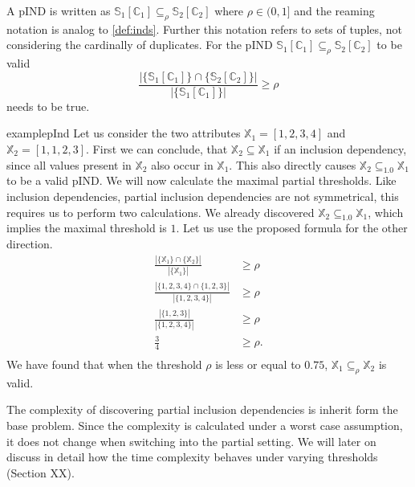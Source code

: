 \begin{definition}\label{def:pinds}
    A pIND is written as $\mathbb{S}_1[\mathbb{C}_1] \subseteq_{\rho} \mathbb{S}_2[\mathbb{C}_2]$ where $\rho \in (0, 1]$ and the reaming notation is analog to \ref{def:inds}. Further this notation refers to sets of tuples, not considering the cardinally of duplicates. For the pIND $\mathbb{S}_1[\mathbb{C}_1] \subseteq_{\rho} \mathbb{S}_2[\mathbb{C}_2]$ to be valid
    $$
        \frac{|\{\mathbb{S}_1[\mathbb{C}_1]\} \cap \{\mathbb{S}_2[\mathbb{C}_2]\}|}
            {|\{\mathbb{S}_1[\mathbb{C}_1]\}|} \geq \rho
    $$
    needs to be true.
\end{definition}

\begin{restatable}{example}{pInd}\label{exmp:pInd}
    Let us consider the two attributes $\mathbb{X}_1 = [1, 2, 3, 4]$ and $\mathbb{X}_2 = [1, 1, 2, 3]$. First we can conclude, that $\mathbb{X}_2 \subseteq \mathbb{X}_1$ if an inclusion dependency, since all values present in $\mathbb{X}_2$ also occur in $\mathbb{X}_1$. This also directly causes $\mathbb{X}_2 \subseteq_{1.0} \mathbb{X}_1$ to be a valid pIND. We will now calculate the maximal partial thresholds. Like inclusion dependencies, partial inclusion dependencies are not symmetrical, this requires us to perform two calculations. We already discovered $\mathbb{X}_2 \subseteq_{1.0} \mathbb{X}_1$, which implies the maximal threshold is $1$. Let us use the proposed formula for the other direction.
    \begin{align*}
        \frac{|\{\mathbb{X}_1\} \cap \{\mathbb{X}_2\}|}
            {|\{\mathbb{X}_1\}|} & \geq \rho \\
        \frac{|\{1, 2, 3, 4\} \cap \{1, 2, 3\}|}
            {|\{1, 2, 3, 4\}|} & \geq \rho \\ 
        \frac{|\{1, 2, 3\}|}
            {|\{1, 2, 3, 4\}|} & \geq \rho \\
        \frac{3}{4} & \geq \rho. \\ 
    \end{align*}
    We have found that when the threshold $\rho$ is less or equal to $0.75$, $\mathbb{X}_1 \subseteq_{\rho} \mathbb{X}_2$ is valid.
\end{restatable}

The complexity of discovering partial inclusion dependencies is inherit form the base problem. Since the complexity is calculated under a worst case assumption, it does not change when switching into the partial setting. We will later on discuss in detail how the time complexity behaves under varying thresholds (Section XX).  

